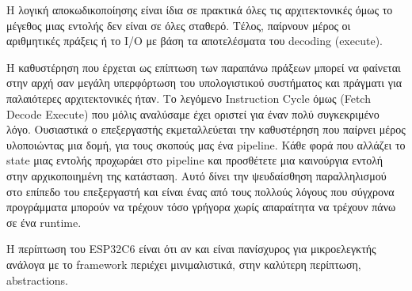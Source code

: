 Η λογική αποκωδικοποίησης είναι ίδια σε πρακτικά όλες τις
αρχιτεκτονικές όμως το μέγεθος μιας εντολής δεν είναι σε όλες
σταθερό. Τέλος, παίρνουν μέρος οι αριθμητικές πράξεις ή το I/O με βάση
τα αποτελέσματα του decoding (execute).

Η καθυστέρηση που έρχεται ως επίπτωση των παραπάνω πράξεων μπορεί να
φαίνεται στην αρχή σαν μεγάλη υπερφόρτωση του υπολογιστικού συστήματος
και πράγματι για παλαιότερες αρχιτεκτονικές ήταν. Το λεγόμενο
Instruction Cycle όμως (Fetch \rightarrow Decode \rightarrow Execute)
που μόλις αναλύσαμε έχει οριστεί για έναν πολύ συγκεκριμένο
λόγο. Ουσιαστικά ο επεξεργαστής εκμεταλλεύεται την καθυστέρηση που
παίρνει μέρος υλοποιώντας μια δομή, για τους σκοπούς μας ένα
pipeline. Κάθε φορά που αλλάζει το state μιας εντολής προχωράει
στο pipeline και προσθέτετε μια καινούργια εντολή στην αρχικοποιημένη της
κατάσταση. Αυτό δίνει την ψευδαίσθηση παραλληλισμού στο επίπεδο του επεξεργαστή
και είναι ένας από τους πολλούς λόγους που σύγχρονα προγράμματα μπορούν να τρέχουν
τόσο γρήγορα χωρίς απαραίτητα να τρέχουν πάνω σε ένα runtime.

Η περίπτωση του ESP32C6 είναι ότι αν και είναι πανίσχυρος για μικροελεγκτής ανάλογα
με το framework περιέχει μινιμαλιστικά, στην καλύτερη περίπτωση, abstractions.

